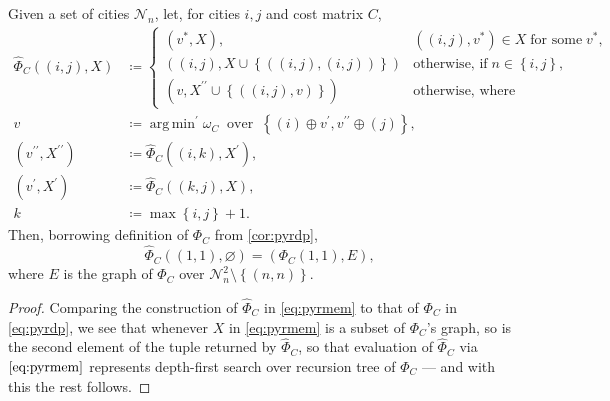 \documentclass[index=totoc,bibliography=totoc]{scrartcl}
\newcommand{\annotation}[1]{\marginpar{\small\itshape\color{green}#1}}
\DeclareMathOperator*{\argmin}{arg\,min}
\numberwithin{equation}{section}
\numberwithin{figure}{section}
\numberwithin{table}{section}
\begin{document}
\begin{proposition}
\label{prop:pyrmem}
  Given a set of cities $\mathcal{N}_n$, let, for cities $i,j$ and cost matrix $C$,
  \begin{align}
    \label{eq:pyrmem}
    \widehat{\Phi}_C\left((i,j),X\right) & \coloneqq
    \begin{cases}
      \left(v^\ast,X\right), & \left((i,j),v^\ast\right) \in X \;\text{for some}\; v^\ast,
      \\
      \left((i,j),X \cup \left\{\left((i,j),(i,j)\right)\right\}\right) & \text{otherwise, if}\; n \in \left\{i,j\right\},
      \\
      \left(v,X^{\prime\prime} \cup \left\{\left((i,j),v\right)\right\}\right) & \text{otherwise, where}
    \end{cases}
    \\
    v & \coloneqq {\argmin}^\prime \omega_C
    \;\;\text{over}\;\; {\left\{(i) \oplus v^\prime, v^{\prime\prime} \oplus (j) \right\}},
    \nonumber
    \\
    \left(v^{\prime\prime},X^{\prime\prime}\right) & \coloneqq \widehat{\Phi}_C\left((i,k),X^\prime\right),
    \nonumber
    \\
    \left(v^{\prime},X^{\prime}\right) & \coloneqq \widehat{\Phi}_C\left((k,j),X\right),
    \nonumber
    \\
    k & \coloneqq \max \left\{i,j\right\} + 1.
    \nonumber
  \end{align}
  Then, borrowing definition of $\Phi_C$ from \cref{cor:pyrdp},
  \[
    \widehat{\Phi}_C\left((1,1),\varnothing\right) = \left(\Phi_C\left(1,1\right),E\right),
  \]
  where $E$ is the graph of $\Phi_C$ over $\mathcal{N}_n^2 \setminus \left\{(n,n)\right\}$.
\end{proposition}
\begin{proof}
  Comparing the construction of $\widehat{\Phi}_C$ in \cref{eq:pyrmem} to
  that of $\Phi_C$ in \cref{eq:pyrdp}, we see that whenever $X$ in
  \eqref{eq:pyrmem} is a subset of $\Phi_C$'s graph, so is the second
  element of the tuple returned by $\widehat{\Phi}_C$, so that evaluation of
  $\widehat{\Phi}_C$ via $\eqref{eq:pyrmem}$ represents depth-first
  search over recursion tree of $\Phi_C$ --- and with this the rest
  follows.
\end{proof}
\end{document}
